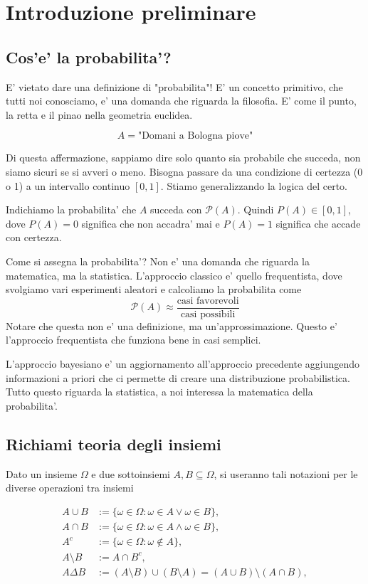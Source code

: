 % 
\chapter{Introduzione preliminare}

\section{Cos'e' la probabilita'?}

E' vietato dare una definizione di "probabilita"! E' un concetto primitivo, che tutti noi conosciamo, e' una domanda che riguarda la filosofia. E' come il punto, la retta e il pinao nella geometria euclidea.

\[
A = \text{"Domani a Bologna piove"}
\]

Di questa affermazione, sappiamo dire solo quanto sia probabile che succeda, non siamo sicuri se si avveri o meno. Bisogna passare da una condizione di certezza (0 o 1) a un intervallo continuo $ [0,1] $. Stiamo generalizzando la logica del certo. 

Indichiamo la probabilita' che $ A $ succeda con $ \mathcal{P}(A) $. Quindi $ P(A) \in [0,1] $, dove $ P(A) = 0 $ significa che non accadra' mai e $ P(A) = 1 $ significa che accade con certezza.

Come si assegna la probabilita'? Non e' una domanda che riguarda la matematica, ma la statistica. L'approccio classico e' quello frequentista, dove svolgiamo vari esperimenti aleatori e calcoliamo la probabilita come 
\[
  \mathcal{P}(A) \approx \frac{\text{casi favorevoli}}{\text{casi possibili}}
\]
Notare che questa non e' una definizione, ma un'approssimazione. Questo e' l'approccio frequentista che funziona bene in casi semplici.

L'approccio bayesiano e' un aggiornamento all'approccio precedente aggiungendo informazioni a priori che ci permette di creare una distribuzione probabilistica. Tutto questo riguarda la statistica, a noi interessa la matematica della probabilita'.

\section{Richiami teoria degli insiemi}
Dato un insieme $\Omega$ e due sottoinsiemi $A,B\subseteq  \Omega$, si useranno tali notazioni per le diverse operazioni tra insiemi

\[
    \begin{aligned}
        A \cup B &:= \{\omega \in \Omega : \omega \in A \lor \omega \in B\}, \\
        A \cap B &:= \{\omega \in \Omega : \omega \in A \land \omega \in B\}, \\
        A^c &:= \{\omega \in \Omega : \omega \notin A\}, \\
        A \setminus B &:= A \cap B^c, \\
        A \Delta B &:= (A \setminus B) \cup (B \setminus A) = (A \cup B) \setminus (A \cap B),
    \end{aligned}
\]

